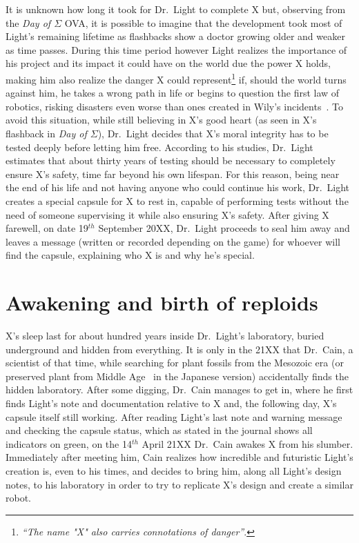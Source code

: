 It is unknown how long it took for Dr.~Light to complete X but, observing from the \emph{Day of $\Sigma$} OVA, it is possible to imagine that the development took most of Light's remaining lifetime as flashbacks show a doctor growing older and weaker as time passes.  During this time period however Light realizes the importance of his project and its impact it could have on the world due the power X holds, making him also realize the danger X could represent\footnote{\textit{``The name "X" also carries connotations of danger''}.} if, should the world turns against him, he takes a wrong path in life or begins to question the first law of robotics, risking disasters even worse than ones created in Wily's incidents~\cite{elysium_light_warning}. To avoid this situation, while still believing in X's good heart (as seen in X's flashback in \emph{Day of $\Sigma$}), Dr.~Light decides that X's moral integrity has to be tested deeply before letting him free. According to his studies, Dr.~Light estimates that about thirty years of testing should be necessary to completely ensure X's safety, time far beyond his own lifespan. For this reason, being near the end of his life and not having anyone who could continue his work, Dr.~Light creates a special capsule for X to rest in, capable of performing tests without the need of someone supervising it while also ensuring X's safety. After giving X farewell, on date 19$^{th}$ September 20XX, Dr.~Light proceeds to seal him away and leaves a message (written or recorded depending on the game) for whoever will find the capsule, explaining who X is and why he's special.

\section{Awakening and birth of reploids}
X's sleep last for about hundred years inside Dr.~Light's laboratory, buried underground and hidden from everything. It is only in the 21XX that Dr.~Cain, a scientist of that time, while searching for plant fossils  from the Mesozoic era (or preserved plant from Middle Age~\cite{elysium_Cain_journal} in the Japanese version) accidentally finds the hidden laboratory. After some digging, Dr.~Cain manages to get in, where he first finds Light's note and documentation relative to X and, the following day, X's capsule itself still working. After reading Light's last note and warning message and checking the capsule status, which as stated in the journal shows all indicators on green, on the 14$^{th}$ April 21XX Dr.~Cain awakes X from his slumber. Immediately after meeting him, Cain realizes how incredible and futuristic Light's creation is, even to his times, and decides to bring him, along all Light's design notes, to his laboratory in order to try to replicate X's design and create a similar robot.

